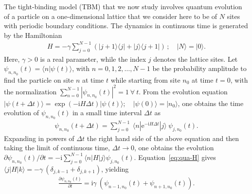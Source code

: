 \documentclass[12pt]{iopart}
\def\ra{\rangle}
\newcommand{\bk}[2]{\langle #1|#2\rangle}   %
\newcommand{\ee}{\mathrm{e}}
\newcommand{\ii}{\mathrm{i}}
\begin{document}
The tight-binding model (TBM) that we now study involves quantum evolution of a particle
on a one-dimensional lattice that we consider here to be of $N$ sites
with periodic boundary conditions. The dynamics in continuous time is generated by the Hamiltonian~\cite{qua-Dunlap:1986,qua-Dunlap:1988}
\begin{align}
H=-\gamma \sum_{j=0}^{N-1} (|j+1\rangle \langle j|+|j\rangle \langle
j+1|) \, ; \quad |N\rangle=|0\rangle.
\label{eq:qua-H}
\end{align}
Here, $\gamma >0$ is a real parameter, while the index $j$ denotes the lattice sites. Let
$\psi_{n,n_0}(t)= \bk{n}{\psi(t)}$, with $n=0,1,2,\ldots,N-1$
be the probability amplitude to find the particle on site $n$ at time
$t$ while starting from site $n_0$ at time $t=0$, with the normalization
$\sum_{n=0}^{N-1} |\psi_{n,n_0}(t)|^2=1~\forall~t$. From the evolution
equation $| \psi(t+\Delta t) \ra = \exp(-\ii H \Delta t) | \psi(t) \ra; \quad | \psi(0) \ra = | n_0 \ra$, one obtains the time
evolution of $\psi_{n,n_0}(t)$ in a small time interval $\Delta t$  as 
\begin{align}
\psi_{n,n_0}(t+\Delta t)=\sum_{j=0}^{N-1} ~\langle n |\ee^{-\ii H\Delta t} |j\rangle ~ \psi_{j,n_0}(t).
\end{align}
Expanding in powers of $\Delta t$ the right hand side of the
above equation and then taking the limit of
continuous time, $\Delta t \to 0$, one obtains the evolution
$\partial \psi_{n,n_0}(t)/\partial t=-\ii\sum_{j=0}^{N-1} \langle
n|H|j\rangle \psi_{j,n_0}(t)$. Equation~\eqref{eq:qua-H} gives $\langle
j|H|k\rangle=-\gamma~(\delta_{j,k-1}+\delta_{j,k+1})$, yielding
\begin{align}
\frac{\partial \psi_{n,n_0}(t)}{\partial t}=\ii\gamma~(
\psi_{n-1,n_0}(t)+\psi_{n+1,n_0}(t)).
\label{eq:qua-psin-time-evolution-1}
\end{align}
\end{document}
